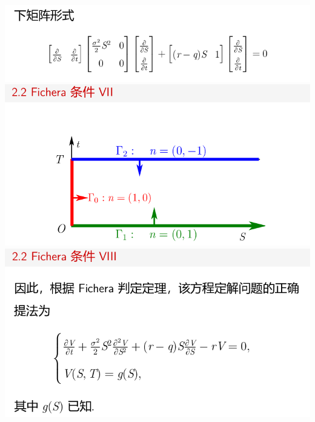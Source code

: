 \documentclass[11pt,a4paper]{ctexart}
\begin{document}
\begin{paracol}{2}
\includegraphics[width=\linewidth]{chap05_27.png}
\includegraphics[width=\linewidth]{chap05_28.png}
\includegraphics[width=\linewidth]{chap05_29.png}
\newpage


\end{paracol}
\end{document}
